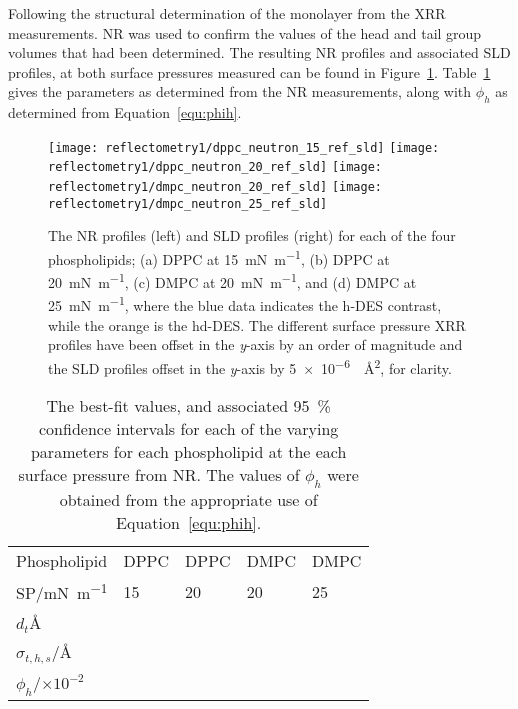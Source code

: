 Following the structural determination of the monolayer from the XRR measurements.
NR was used to confirm the values of the head and tail group volumes that had been determined.
The resulting NR profiles and associated SLD profiles, at both surface pressures measured can be found in Figure~\ref{fig:nrref}.
Table~\ref{tab:nrref} gives the parameters as determined from the NR measurements, along with $\phi_h$ as determined from Equation~\ref{equ:phih}.
%
\begin{figure}
    \centering
    \texttt{[image: reflectometry1/dppc\_neutron\_15\_ref\_sld]}
    \texttt{[image: reflectometry1/dppc\_neutron\_20\_ref\_sld]}
    \texttt{[image: reflectometry1/dmpc\_neutron\_20\_ref\_sld]}
    \texttt{[image: reflectometry1/dmpc\_neutron\_25\_ref\_sld]}
    \caption{The NR profiles (left) and SLD profiles (right) for each of the four phospholipids; (a) DPPC at \SI{15}{\milli\newton\per\meter}, (b) DPPC at \SI{20}{\milli\newton\per\meter}, (c) DMPC at \SI{20}{\milli\newton\per\meter}, and (d) DMPC at \SI{25}{\milli\newton\per\meter}, where the blue data indicates the h-DES contrast, while the orange is the hd-DES. The different surface pressure XRR profiles have been offset in the \emph{y}-axis by an order of magnitude and the SLD profiles offset in the \emph{y}-axis by \SI{5e-6}{\per\angstrom\squared}, for clarity.}
    \label{fig:nrref}
\end{figure}
%
%
\begin{table}
    \centering
    \small
    \caption{The best-fit values, and associated \SI{95}{\percent} confidence intervals for each of the varying parameters for each phospholipid at the each surface pressure from NR. The values of $\phi_h$ were obtained from the appropriate use of Equation~\protect\ref{equ:phih}.}
    \label{tab:nrref}
    \begin{tabular}{l | l l l l}
        \toprule
        Phospholipid & DPPC & DPPC & DMPC & DMPC \\
        SP/\si{\milli\newton\per\meter} & 15 & 20 & 20 & 25 \\
        \midrule
        $d_t$\si{\angstrom} &  &  &  &  \\
        $\sigma_{t,h,s}$/\si{\angstrom} &  &  &  &  \\
        \midrule
        $\phi_h$/$\times 10^{-2}$ &  &  &  &  \\
        \bottomrule
    \end{tabular}
\end{table}
